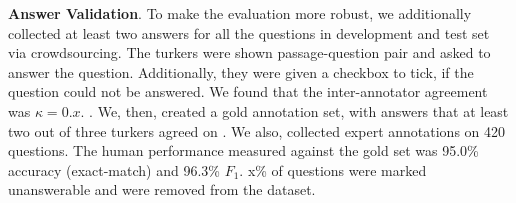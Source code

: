 \textbf{Answer Validation}. 
To make the evaluation more robust, we additionally collected at least two answers for all the questions in development and test set via crowdsourcing. The turkers were shown passage-question pair and asked to answer the question. Additionally, they were given a checkbox to tick, if the question could not be answered. We found that the inter-annotator agreement was $\kappa=0.x$. . We, then, created a gold annotation set, with answers that at least two out of three turkers agreed on . We also, collected expert annotations on 420 questions. The human performance measured against the gold set was 95.0\% accuracy (exact-match) and 96.3\% $F_1$. x\% of questions were marked unanswerable and were removed from the dataset.



